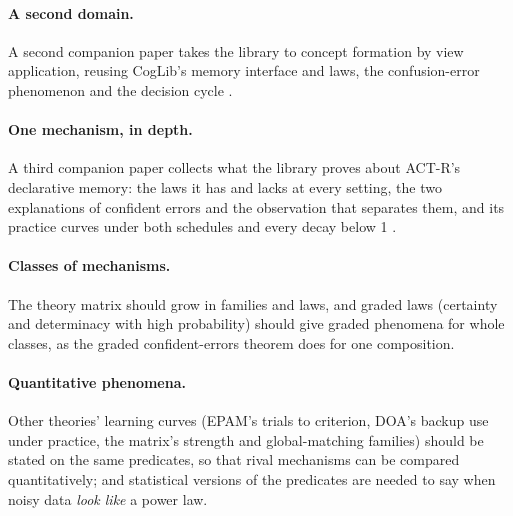 \documentclass[11pt]{article}
\begin{document}
\paragraph{A second domain.} A second companion paper takes the library to concept formation by view application, reusing CogLib's memory interface and laws, the confusion-error phenomenon and the decision cycle \citep{shrager2026view}.

\paragraph{One mechanism, in depth.} A third companion paper collects what the library proves about ACT-R's declarative memory: the laws it has and lacks at every setting, the two explanations of confident errors and the observation that separates them, and its practice curves under both schedules and every decay below 1 \citep{shrager2026actr}.

\paragraph{Classes of mechanisms.} The theory matrix should grow in families and laws, and graded laws (certainty and determinacy with high probability) should give graded phenomena for whole classes, as the graded confident-errors theorem does for one composition.

\paragraph{Quantitative phenomena.} Other theories' learning curves (EPAM's trials to criterion, DOA's backup use under practice, the matrix's strength and global-matching families) should be stated on the same predicates, so that rival mechanisms can be compared quantitatively; and statistical versions of the predicates are needed to say when noisy data \emph{look like} a power law.
\end{document}
